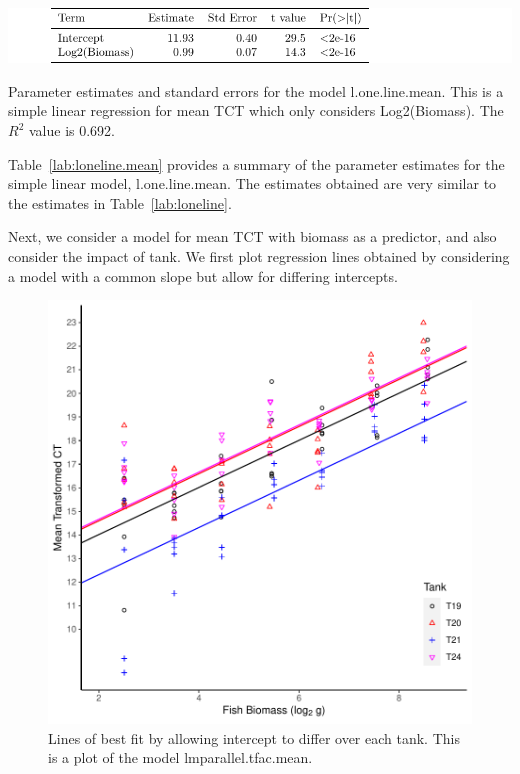 \vspace{5mm}




\begin{table}[H]
\includegraphics{Chapter3Images/lmMeanCorrect.pdf}
\caption{\hspace{1mm} Parameter estimates and standard errors for the model l.one.line.mean. This is a simple linear regression for mean TCT which only considers Log2(Biomass). The $R^{2}$ value is 0.692.}
\label{lab:loneline.mean}
\end{table}








Table~\ref{lab:loneline.mean} provides a summary of the parameter estimates for the simple linear model, l.one.line.mean. The estimates obtained are very similar to the estimates in Table~\ref{lab:loneline}.

\newpage

Next, we consider a model for mean TCT with biomass as a predictor, and also consider the impact of tank. We first plot regression lines obtained by considering a model with a common slope but allow for differing intercepts.

\begin{figure}[H]
\includegraphics{Chapter3Images/parmean.pdf}
\caption{\hspace{1mm} Lines of best fit by allowing intercept to differ over each tank. This is a plot of the model lmparallel.tfac.mean.}
\label{fig:parmean}
\end{figure}









